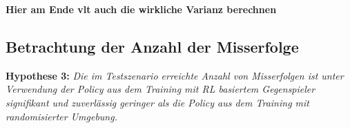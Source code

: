 \textbf{Hier am Ende vlt auch die wirkliche Varianz berechnen}

\subsection{Betrachtung der Anzahl der Misserfolge}

\textbf{Hypothese 3:}
\textit{Die im Testszenario erreichte Anzahl von Misserfolgen ist unter Verwendung der Policy aus dem Training mit RL basiertem Gegenspieler signifikant und zuverlässig geringer als die Policy aus dem Training mit randomisierter Umgebung.}





